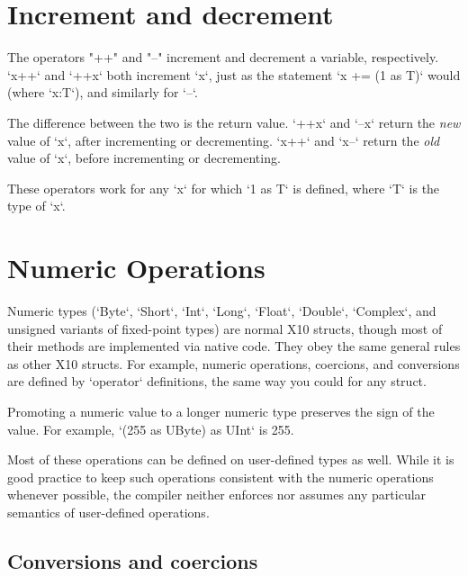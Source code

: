 \section{Increment and decrement}
\index{\Xcd{++}}
\index{\Xcd{--}}


The operators \xcd"++" and \xcd"--" increment and decrement
a variable, respectively.  
\xcd`x++` and \xcd`++x` both increment \xcd`x`, just as the statement 
\xcd`x += (1 as T)` would (where \xcd`x:T`), and similarly for \xcd`--`.  

The difference between the two is the return value.  
\xcd`++x` and \xcd`--x` return the {\em new} value of \xcd`x`, after
incrementing or decrementing.
\xcd`x++` and \xcd`x--` return the {\em old} value of \xcd`x`, before
incrementing or decrementing.

These operators work for any \xcd`x` for which \xcd`1 as T` is defined, where
\xcd`T` is the type of \xcd`x`.  


\section{Numeric Operations}
\label{XtenPromotions}

Numeric types (\xcd`Byte`, \xcd`Short`, \xcd`Int`, \xcd`Long`, \xcd`Float`,
\xcd`Double`, \xcd`Complex`, and unsigned variants of fixed-point types) are normal X10
structs, though most of their methods are implemented via native code. They
obey the same general rules as other X10 structs. For example, numeric
operations, coercions, and conversions are defined by \xcd`operator` definitions, the same way you could
for any struct.

Promoting a numeric value to a longer numeric type preserves the sign of the
value.  For example, \xcd`(255 as UByte) as UInt` is 255. 

Most of these operations can be defined on user-defined types as well.  While
it is good practice to keep such operations consistent with the numeric
operations whenever possible, the compiler neither enforces nor assumes any
particular semantics of user-defined operations. 

\subsection{Conversions and coercions}
\label{sect:ConvAndCoerc}


